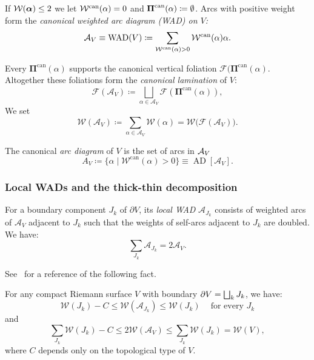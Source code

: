 \documentclass{amsart}
\newcommand{\AD}{{\operatorname{AD}}}
\newcommand{\WAD}{{\operatorname{WAD}}}
\newcommand{\balpha}{{\ba}}
\newcommand{\bPi}{{\boldsymbol \Pi}}
\newcommand{\can}{{\operatorname{can}}}
\renewcommand{\sp}{{\ \ }}
\newcommand{\1}{{\mathbb 1 }}
\newcommand{\Fam}{{\mathcal F}}
\newcommand{\Width}{{\mathcal W}}
\renewcommand{\AA}{{\mathcal A}}
\begin{document}
If $\WW(\balpha)\leq 2$ we let  $\WW^\can(\alpha) =0$ and $\BPi^\can(\alpha)\coloneqq \emptyset$. Arcs with positive weight form the {\it canonical weighted arc diagram
(WAD) on $V$:}
\begin{equation}
\label{eq:WAD:dfn}
\AAA_V\equiv \WAD (V)\coloneqq\sum_{\Width^\can(\alpha)>0} \Width^\can(\alpha)\alpha .
\end{equation}


Every $\bPi^\can(\alpha)$ supports the canonical
vertical foliation $\Fam(\bPi^\can(\alpha)$. Altogether these foliations form the
{\it canonical lamination} of $V$:
\begin{equation}
\label{eq:can laminat}
\Fam(\AA_V)\coloneqq \bigsqcup_{\alpha \in \AA_V} \Fam(\bPi^\can(\alpha)),
\end{equation}
 We set
\begin{equation}
\label{eq:can laminat:weight}\Width(\AA_V)\coloneqq \sum_{\alpha\in \AA_V}  \Width(\alpha) =\Width\big( \Fam(\AA_V)\big).
\end{equation}

The canonical \emph{arc diagram} of $V$ is the set of arcs in ${\mathcal A}_V$ 
\[A_V \coloneqq \{\alpha\mid \Width^\can (\alpha)>0\}\equiv \AD[\AA_V].\]





\subsubsection{Local WADs and the thick-thin decomposition}\label{sss:LocalWAD}

For a boundary component $J_k$ of $\partial V$, its \emph{local WAD} $\AA_{J_k}$ consists of weighted arcs of $\AA_V$ adjacent to $J_k$ such that the weights of self-arcs adjacent to $J_k$ are doubled. We have:
\[   \sum_{J_k} \AA_{J_k}= 2\AA_V .\]





See~\cite[\S 7.6]{L:book} for a reference of the following fact. 

\begin{thm}\label{thin-thick for S}
 For any compact Riemann surface $V$ with boundary $\partial V = \bigsqcup_k J_k$,  we have:
\[\Width(J_k)  -  C  \leq   \Width(\AA_{J_k}) \leq \Width(J_k)\sp\sp \text{ for every }J_k\]
and     
\[
    \sum_{J_k} \Width(J_k)   -  C  \leq  2 \Width(\AA_V) \leq     \sum_{J_k} \Width(J_k)  
=\Width(V),    \]
 where $C$ depends only on the topological type of $V$.
\end{thm}
\end{document}
